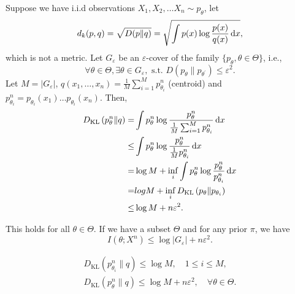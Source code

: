Suppose we have i.i.d observations $X_{1},X_{2},\ldots X_{n}\sim p_{\theta}$, let
\begin{equation}
	d_{k}(p,q)=\sqrt{D(p\|q)}=\sqrt{\int p(x)\log\frac{p(x)}{q(x)}\mathop{}\!\mathrm{d} x},
\end{equation}
which is not a metric. Let $G_{\varepsilon}$ be an $\varepsilon$-cover of the family $\{p_{\theta},\theta\in\Theta\}$, i.e.,
\begin{equation}
	\forall\theta\in\Theta,\exists\theta\in G_{\varepsilon},\text{ s.t. }D\left(p_{\theta}\|p_{\theta^{\prime}}\right)\leq\varepsilon^{2}.
\end{equation}
Let $M=\left|G_{\varepsilon}\right|$, $q(x_{1},\ldots,x_{n})=\frac{1}{M}\sum_{i=1}^{M}p_{\theta_{i}}^{n}$ (centroid) and $p_{\theta_{i}}^{n}=p_{\theta_{i}}(x_{1})\ldots p_{\theta_{i}}(x_{n})$. Then,
\begin{equation}
	\begin{aligned}
		D_{\text{KL}}\left(p_{\theta}^{n}\|q\right)= & \int p_{\theta}^{n}\log\frac{p_{\theta}^{n}}{\frac{1}{M}\sum_{i=1}^{M}p_{\theta_{i}}^{n}}\mathop{}\!\mathrm{d} x \\
		\leq                                         & \int p_{\theta}^{n}\log\frac{p_{\theta}^{n}}{\frac{1}{M}p_{\theta_{i}}^{n}}\mathop{}\!\mathrm{d} x               \\
		=                                            & \log M+\inf_{i}\int p_{\theta}^{n}\log\frac{p_{\theta}^{n}}{p_{\theta_{i}}^{n}}\mathop{}\!\mathrm{d} x           \\
		=                                            & log M+\inf_{i}D_{\text{KL}}\left(p_{\theta}\|p_{\theta_{i}}\right)                              \\
		\leq                                         & \log M+n\varepsilon^{2}.
	\end{aligned}
\end{equation}

This holds for all $\theta\in\Theta$. If we have a subset $\Theta$ and for any prior $\pi$, we have
\begin{equation}
	I\left(\theta;X^{n}\right)\leq\log|G_{\varepsilon}|+n\varepsilon^{2}.
\end{equation}

\begin{gather*}
	D_{\text{KL}}\left(p_{\theta_{i}}^{n}\|q\right)\leq\log M,\quad 1\leq i \leq M,\\
	D_{\text{KL}}\left(p_{\theta}^{n}\|q\right)\leq\log M+n\varepsilon^{2},\quad\forall\theta\in\Theta.
\end{gather*}


